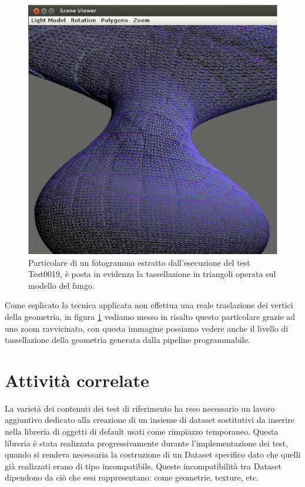 \begin{figure}
\begin{center}
\includegraphics[width=\textwidth]{Immagini/test0019/test0019-tessel}
\caption{Particolare di un fotogramma estratto dall'esecuzione del test Test0019, \`e posta in evidenza la tassellazione in triangoli operata sul modello del fungo. \label{f:test0019-tessel}} 
\end{center} 
\end{figure}
Come esplicato la tecnica applicata non effettua una reale traslazione dei vertici della geometria, in figura \ref{f:test0019-tessel} vediamo messo in risalto questo particolare grazie ad uno zoom ravvicinato, con questa immagine possiamo vedere anche il livello di tassellazione della geometria generata dalla pipeline programmabile.

\section{Attivit\`a correlate}
\label{sec:correlate}
La variet\`a dei contenuti dei test di riferimento ha reso necessario un lavoro aggiuntivo dedicato alla creazione di un insieme di dataset sostitutivi da inserire nella libreria di oggetti di default usati come rimpiazzo temporaneo.
Questa libreria \`e stata realizzata progressivamente durante l'implementazione dei test, quando si rendeva necessaria la costruzione di un Dataset specifico dato che quelli gi\`a realizzati erano di tipo incompatibile.
Queste incompatibilit\`a tra Dataset dipendono da ci\`o che essi rappresentano: come geometrie, texture, etc. 

